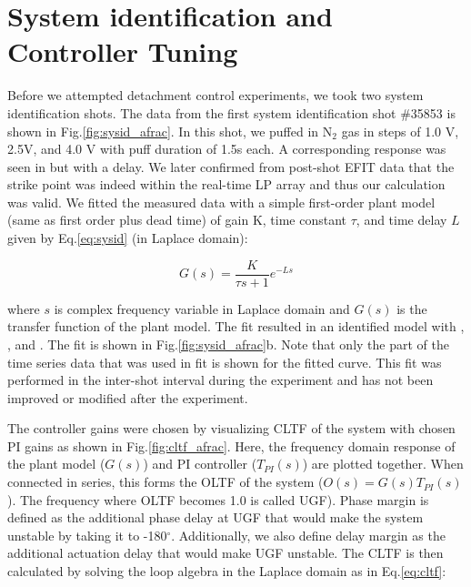








\section{System identification and Controller Tuning}
\label{sec:sysid}







Before we attempted detachment control experiments, we took two system identification shots.
The data from the first system identification shot \#35853 is shown in Fig.\ref{fig:sysid_afrac}.
In this shot, we puffed in N$_2$ gas in steps of 1.0 V, 2.5V, and 4.0 V with puff duration of 1.5s each.
A corresponding response was seen in \Afrac but with a delay.
We later confirmed from post-shot EFIT data that the strike point was indeed within the real-time \ac{LP} array and thus our \Afrac calculation was valid.
We fitted the measured data with a simple first-order plant model (same as first order plus dead time\cite{Eldon_2022_PPCF}) of gain K, time constant $\tau$, and time delay $L$ given by Eq.\ref{eq:sysid} (in Laplace domain):

\begin{equation}
 G(s) = \frac{K}{\tau s + 1}e^{-L s}
\label{eq:sysid}
\end{equation}

where $s$ is complex frequency variable in Laplace domain and $G(s)$ is the transfer function of the plant model.
The fit resulted in an identified model with \AfracK, \AfracTau, and \AfracL.
The fit is shown in Fig.\ref{fig:sysid_afrac}b.
Note that only the part of the time series data that was used in fit is shown for the fitted curve.
This fit was performed in the inter-shot interval during the experiment and has not been improved or modified after the experiment.

The controller gains were chosen by visualizing \ac{CLTF} of the system with chosen PI gains as shown in Fig.\ref{fig:cltf_afrac}.
Here, the frequency domain response of the plant model ($G(s)$) and PI controller ($T_{PI}(s)$) are plotted together.
When connected in series, this forms the \ac{OLTF} of the system ($O(s) = G(s) T_{PI}(s)$).
The frequency where \ac{OLTF} becomes 1.0 is called \ac{UGF}).
Phase margin is defined as the additional phase delay at \ac{UGF} that would make the system unstable by taking it to -180$^\circ$.
Additionally, we also define delay margin as the additional actuation delay that would make \ac{UGF} unstable.
The \ac{CLTF} is then calculated by solving the loop algebra in the Laplace domain as in Eq.\ref{eq:cltf}:


